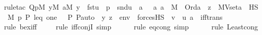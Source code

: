 \begin{isabellebody}
{\isacharparenleft}{\kern0pt}rule{\isacharunderscore}{\kern0pt}tac\ Q{\isacharequal}{\kern0pt}{\isachardoublequoteopen}{\isacharparenleft}{\kern0pt}{\isasymexists}p{\isasymin}M{\isachardot}{\kern0pt}\ {\isasymexists}y{\isasymin}M{\isachardot}{\kern0pt}\ {\isasymexists}a{\isasymin}M{\isachardot}{\kern0pt}\ y\ {\isacharequal}{\kern0pt}\ fst{\isacharparenleft}{\kern0pt}u{\isacharparenright}{\kern0pt}\ {\isasymand}\ p\ {\isacharequal}{\kern0pt}\ snd{\isacharparenleft}{\kern0pt}u{\isacharparenright}{\kern0pt}\ {\isasymand}\ a\ {\isacharequal}{\kern0pt}\ {\isacharparenleft}{\kern0pt}{\isasymmu}\ a{\isachardot}{\kern0pt}\ a\ {\isasymin}\ M\ {\isasymand}\ Ord{\isacharparenleft}{\kern0pt}a{\isacharparenright}{\kern0pt}\ {\isasymand}\ {\isacharparenleft}{\kern0pt}{\isasymexists}z\ {\isasymin}\ MVset{\isacharparenleft}{\kern0pt}a{\isacharparenright}{\kern0pt}\ {\isasyminter}\ HS{\isachardot}{\kern0pt}\ M{\isacharcomma}{\kern0pt}\ {\isacharbrackleft}{\kern0pt}p{\isacharcomma}{\kern0pt}\ P{\isacharcomma}{\kern0pt}\ leq{\isacharcomma}{\kern0pt}\ one{\isacharcomma}{\kern0pt}\ {\isasymlangle}{\isasymF}{\isacharcomma}{\kern0pt}\ {\isasymG}{\isacharcomma}{\kern0pt}\ P{\isacharcomma}{\kern0pt}\ P{\isacharunderscore}{\kern0pt}auto{\isasymrangle}{\isacharbrackright}{\kern0pt}\ {\isacharat}{\kern0pt}\ {\isacharbrackleft}{\kern0pt}y{\isacharcomma}{\kern0pt}\ z{\isacharbrackright}{\kern0pt}\ {\isacharat}{\kern0pt}\ env\ {\isasymTurnstile}\ forcesHS{\isacharparenleft}{\kern0pt}{\isasymphi}{\isacharparenright}{\kern0pt}{\isacharparenright}{\kern0pt}{\isacharparenright}{\kern0pt}\ {\isasymand}\ v\ {\isacharequal}{\kern0pt}\ {\isasymlangle}u{\isacharcomma}{\kern0pt}\ a{\isasymrangle}{\isacharparenright}{\kern0pt}{\isachardoublequoteclose}\ \ iff{\isacharunderscore}{\kern0pt}trans{\isacharparenright}{\kern0pt}\isanewline
\ \ \ \ \isamarkupfalse%
{\isacharparenleft}{\kern0pt}rule\ bex{\isacharunderscore}{\kern0pt}iff{\isacharparenright}{\kern0pt}{\isacharplus}{\kern0pt}\isanewline
\ \ \ \ \isamarkupfalse%
{\isacharparenleft}{\kern0pt}rule\ iff{\isacharunderscore}{\kern0pt}conjI{}{\isacharcomma}{\kern0pt}\ simp{\isacharparenright}{\kern0pt}{\isacharplus}{\kern0pt}\isanewline
\ \ \ \ \ \isamarkupfalse%
{\isacharparenleft}{\kern0pt}rule\ eq{\isacharunderscore}{\kern0pt}cong{\isacharcomma}{\kern0pt}\ simp{\isacharparenright}{\kern0pt}\isanewline
\ \ \ \ \ \isamarkupfalse%
{\isacharparenleft}{\kern0pt}rule\ Least{\isacharunderscore}{\kern0pt}cong{\isacharparenright}{\kern0pt}\isanewline
\ \ \ \ \ \isamarkupfalse%

\end{isabellebody}
